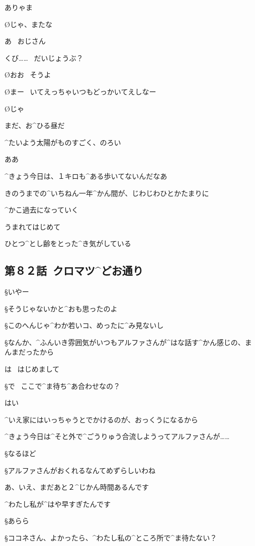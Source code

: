 \A ありゃま

\O じゃ、またな

\A あ
\ おじさん

\page
\A くび……
\ だいじょうぶ？

\O おお
\ そうよ

\O まー
\ いてえっちゃいつもどっかいてえしなー

\O じゃ

\page[67]
\A まだ、お^{ひる}{昼}だ

\A ^{たいよう}{太陽}がものすごく、のろい

\A ああ

\A ^{きょう}{今日}は、１キロも^{ある}{歩}いてないんだなあ

\page
\A きのうまでの^{いちねん}{一年}^{かん}{間}が、じわじわひとかたまりに

\A ^{かこ}{過去}になっていく

\A うまれてはじめて

\A ひとつ^{とし}{齢}をとった^{き}{気}がしている


\subsection{第８２話\ クロマツ^{どお}{通}り}

\page[73]
\S いやー

\S そうじゃないかと^{おも}{思}ったのよ

\S このへんじゃ^{わか}{若}いコ、めったに^{み}{見}ないし

\S なんか、^{ふんいき}{雰囲気}がいつもアルファさんが^{はな}{話}す^{かん}{感}じの、まんまだったから

\K は
\ はじめまして

\page
\S で
\ ここで^{ま}{待}ち^{あ}{合}わせなの？

\K はい

\K ^{いえ}{家}にはいっちゃうとでかけるのが、おっくうになるから

\K ^{きょう}{今日}は^{そと}{外}で^{ごうりゅう}{合流}しようってアルファさんが……

\S なるほど

\S アルファさんがおくれるなんてめずらしいわね

\K あ、いえ、まだあと２^{じかん}{時間}あるんです

\K ^{わたし}{私}が^{はや}{早}すぎたんです

\S あらら

\page
\S ココネさん、よかったら、^{わたし}{私}の^{ところ}{所}で^{ま}{待}たない？

